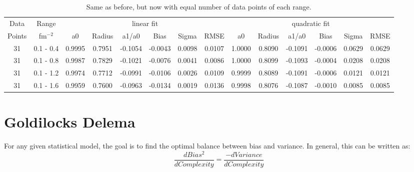 \documentclass[10pt,aps,prc,twocolumn]{revtex4-1}
\begin{document}
\begin{table}
\label{equaldatatable}
\caption{Same as before, but now with equal number of data points of each range.}
\begin{tabular}{cc|cccccc|cccccc} \hline
Data   & Range     & \multicolumn{6}{c|}{linear fit}                       & \multicolumn{6}{c}{quadratic fit}                    \\ 
Points & fm$^{-2}$ &   a0  & Radius&  a1/a0 &  Bias  & Sigma &  RMSE  &   a0  & Radius& a1/a0  &  Bias  & Sigma &  RMSE \\  \hline
31& 0.1 - 0.4 & 0.9995& 0.7951& -0.1054& -0.0043& 0.0098& 0.0107 & 1.0000& 0.8090& -0.1091& -0.0006& 0.0629& 0.0629 \\
31& 0.1 - 0.8 & 0.9987& 0.7829& -0.1021& -0.0076& 0.0041& 0.0086 & 1.0000& 0.8099& -0.1093& -0.0004& 0.0208& 0.0208  \\
31& 0.1 - 1.2 & 0.9974& 0.7712& -0.0991& -0.0106& 0.0026& 0.0109 & 0.9999& 0.8089& -0.1091& -0.0006& 0.0121& 0.0121  \\
31& 0.1 - 1.6 & 0.9959& 0.7600& -0.0963& -0.0134& 0.0019& 0.0136 & 0.9998& 0.8076& -0.1087& -0.0010& 0.0085& 0.0085  \\ 
\end{tabular}
\end{table}



\section{Goldilocks Delema}

For any given statistical model, the goal is to find the optimal balance between bias and variance.   
In general, this can be written as:
\begin{equation}
\frac{d Bias^2 }{ d Complexity} = \frac{- d Variance }{ d Complexity }
\end{equation}
\end{document}
